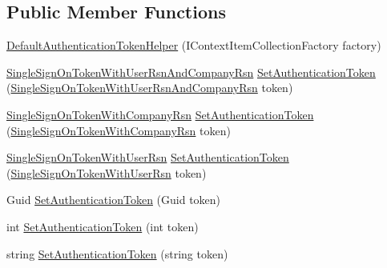 \subsection*{Public Member Functions}
\begin{DoxyCompactItemize}
\item 
\hyperlink{classCqrs_1_1Authentication_1_1DefaultAuthenticationTokenHelper_a21bfae37d24b180797211396a0348526_a21bfae37d24b180797211396a0348526}{Default\+Authentication\+Token\+Helper} (I\+Context\+Item\+Collection\+Factory factory)
\item 
\hyperlink{classCqrs_1_1Authentication_1_1SingleSignOnTokenWithUserRsnAndCompanyRsn}{Single\+Sign\+On\+Token\+With\+User\+Rsn\+And\+Company\+Rsn} \hyperlink{classCqrs_1_1Authentication_1_1DefaultAuthenticationTokenHelper_ab06712f60b8afc6819b5372e3a21e13a_ab06712f60b8afc6819b5372e3a21e13a}{Set\+Authentication\+Token} (\hyperlink{classCqrs_1_1Authentication_1_1SingleSignOnTokenWithUserRsnAndCompanyRsn}{Single\+Sign\+On\+Token\+With\+User\+Rsn\+And\+Company\+Rsn} token)
\item 
\hyperlink{classCqrs_1_1Authentication_1_1SingleSignOnTokenWithCompanyRsn}{Single\+Sign\+On\+Token\+With\+Company\+Rsn} \hyperlink{classCqrs_1_1Authentication_1_1DefaultAuthenticationTokenHelper_a2ae21fb09555d3ab5119f9ea4c69b202_a2ae21fb09555d3ab5119f9ea4c69b202}{Set\+Authentication\+Token} (\hyperlink{classCqrs_1_1Authentication_1_1SingleSignOnTokenWithCompanyRsn}{Single\+Sign\+On\+Token\+With\+Company\+Rsn} token)
\item 
\hyperlink{classCqrs_1_1Authentication_1_1SingleSignOnTokenWithUserRsn}{Single\+Sign\+On\+Token\+With\+User\+Rsn} \hyperlink{classCqrs_1_1Authentication_1_1DefaultAuthenticationTokenHelper_a57d015883b278136590894a3885d246c_a57d015883b278136590894a3885d246c}{Set\+Authentication\+Token} (\hyperlink{classCqrs_1_1Authentication_1_1SingleSignOnTokenWithUserRsn}{Single\+Sign\+On\+Token\+With\+User\+Rsn} token)
\item 
Guid \hyperlink{classCqrs_1_1Authentication_1_1DefaultAuthenticationTokenHelper_ad8c9ad34dde1f36073a1cf54bb82ffc5_ad8c9ad34dde1f36073a1cf54bb82ffc5}{Set\+Authentication\+Token} (Guid token)
\item 
int \hyperlink{classCqrs_1_1Authentication_1_1DefaultAuthenticationTokenHelper_af1d9d9cbb1c02ca9a31b3dbd278f9a3e_af1d9d9cbb1c02ca9a31b3dbd278f9a3e}{Set\+Authentication\+Token} (int token)
\item 
string \hyperlink{classCqrs_1_1Authentication_1_1DefaultAuthenticationTokenHelper_ae37a10289ec6cf99df30e1528feb0394_ae37a10289ec6cf99df30e1528feb0394}{Set\+Authentication\+Token} (string token)
\end{DoxyCompactItemize}


